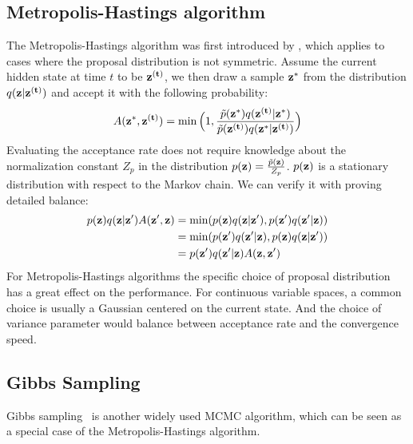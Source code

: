 \subsection{Metropolis-Hastings algorithm}
The Metropolis-Hastings algorithm was first introduced by , which applies to cases where the proposal distribution is not symmetric.
Assume the current hidden state at time $t$ to be ${\bf z^{(t)}}$, we then draw a sample ${\bf z^{*}}$ from the distribution $q({\bf z}| {\bf z^{(t)}})$ and accept it with the following probability:
$$A({\bf z^{*}}, {\bf z^{(t)}})= \min \Big(1, \frac{\tilde{p}({\bf z^{*}})q({\bf z^{(t)}}| {\bf z^{*}})}{\tilde{p}({\bf z^{(t)}})q({\bf z^{*}}| {\bf z^{(t)}})}\Big)$$
Evaluating the acceptance rate does not require knowledge about the normalization constant $Z_p$ in the distribution $p({\bf z})=\frac{\tilde{p}({\bf z})}{Z_p}$. $p({\bf z})$ is a stationary distribution with respect
to the Markov chain. We can verify it with proving detailed balance:
\begin{equation}
\begin{split}
    p({\bf z}) q({\bf z}|{\bf z'}) A({\bf z'}, {\bf z}) &= \min (p({\bf z})q({\bf z}|{\bf z'}),p({\bf z'})q({\bf z'}|{\bf z})) \\ &= \min (p({\bf z'})q({\bf z'}|{\bf z}), p({\bf z})q({\bf z}|{\bf z'})) \\ &= p({\bf z'}) q({\bf z'}|{\bf z}) A({\bf z}, {\bf z'})
\end{split}
\end{equation}
For Metropolis-Hastings algorithms the specific choice of proposal distribution has a great effect on the performance. For continuous variable spaces, a common choice is usually a Gaussian centered on
the current state. And the choice of variance parameter would balance between acceptance rate and the convergence speed.
\subsection{Gibbs Sampling}
Gibbs sampling~\cite{geman1984stochastic} is another widely used MCMC algorithm, which can be seen as a special case of the Metropolis-Hastings algorithm. 


